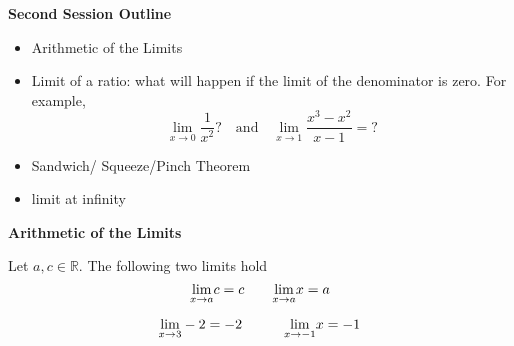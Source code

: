 \documentclass{beamer}
\begin{document}
\begin{frame}{\bf Second Session Outline}
\begin{itemize}
	\item Arithmetic of the Limits
	\item {{ Limit of a ratio: what will happen if the limit of the denominator is zero. For example, 
	}}
	 $$\lim_{x \to 0} \frac{1}{x^2}? \quad \text{and} \quad \lim_{x\to 1} \frac{x^3-x^2}{x-1}=? $$
	\item  Sandwich/ Squeeze/Pinch Theorem
	\item limit at infinity
\end{itemize}
\end{frame}

\begin{frame}
\begin{center}
	{\bf \Large \color{blue}Arithmetic of the Limits}
	\end{center}
\end{frame}


\begin{frame}
\begin{tcolorbox}[width=\textwidth,colback={blue!10},title={},colbacktitle=yellow,coltitle=blue] 
	\begin{theorem}
		Let $a,c\in \mathbb{R}$. The following two limits hold 
		$$  	\underset{x\rightarrow a}{\rm lim}c=c \quad \quad 	\underset{x\rightarrow a}{\rm lim}x=a $$
	\end{theorem}
\end{tcolorbox}

	\begin{tcolorbox}[width=\textwidth,colback={green!10},title={},colbacktitle=yellow,coltitle=blue] 
		\begin{example}
	$$\underset{x\rightarrow 3}{\rm lim}-2=-2\quad \quad \quad \underset{x\rightarrow -1}{\rm lim}x=-1$$
\end{example}
\end{tcolorbox}
\end{frame}
\end{document}
